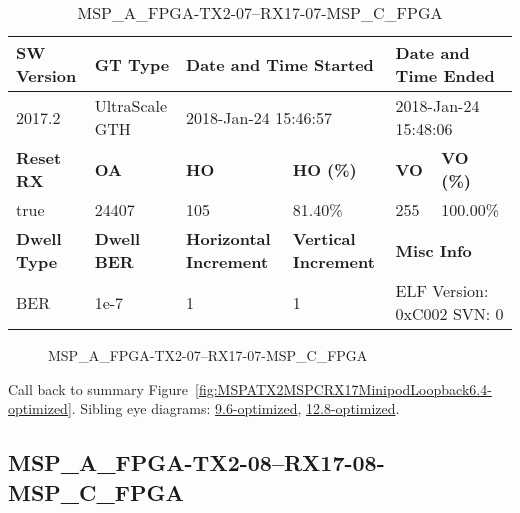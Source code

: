 \begin{table}[h]
\centering
\caption{MSP\_A\_FPGA-TX2-07--RX17-07-MSP\_C\_FPGA}
\label{tab:MSPAFPGATX207RX1707MSPCFPGA6.4-optimized}
\begin{tabular}{@{}|l|l|l|l|l|l|@{}}
\toprule
\textbf{SW Version}                & \textbf{GT Type}   & \multicolumn{2}{l|}{\textbf{Date and Time Started}}            & \multicolumn{2}{l|}{\textbf{Date and Time Ended}}        \\ \midrule
2017.2                       & UltraScale GTH          & \multicolumn{2}{l|}{2018-Jan-24 15:46:57}                   & \multicolumn{2}{l|}{2018-Jan-24 15:48:06}               \\ \midrule
\textbf{Reset RX}                  & \textbf{OA} & \textbf{HO}   & \textbf{HO (\%)} & \textbf{VO} & \textbf{VO (\%)} \\ \midrule
true & 24407        & 105          & 81.40\%        & 255        & 100.00\%       \\ \midrule
\textbf{Dwell Type}                & \textbf{Dwell BER} & \textbf{Horizontal Increment} & \textbf{Vertical Increment}    & \multicolumn{2}{l|}{\textbf{Misc Info}}                  \\ \midrule
BER                            & 1e-7        & 1        & 1           & \multicolumn{2}{l|}{ELF Version: 0xC002 SVN: 0}                         \\ \bottomrule
\end{tabular}
\end{table}

\begin{figure}[h]
\caption{MSP\_A\_FPGA-TX2-07--RX17-07-MSP\_C\_FPGA} \label{fig:MSPAFPGATX207RX1707MSPCFPGA6.4-optimized}
\end{figure}

Call back to summary Figure~\ref{fig:MSPATX2MSPCRX17MinipodLoopback6.4-optimized}.
Sibling eye diagrams: \hyperref[sec:MSPAFPGATX207RX1707MSPCFPGA9.6-optimized]{9.6-optimized}, \hyperref[sec:MSPAFPGATX207RX1707MSPCFPGA12.8-optimized]{12.8-optimized}.

\clearpage
\newpage


\subsection{MSP\_A\_FPGA-TX2-08--RX17-08-MSP\_C\_FPGA}\label{sec:MSPAFPGATX208RX1708MSPCFPGA6.4-optimized}

